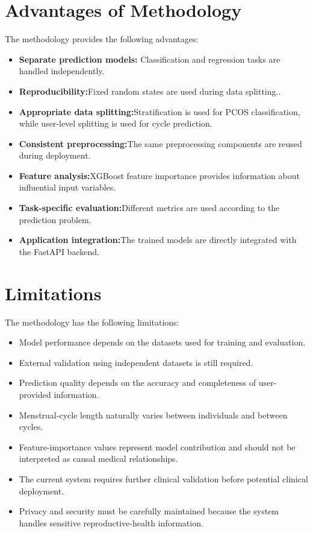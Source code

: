 \section{Advantages of Methodology}
\label{sec:AdvMetho}
The methodology provides the following advantages:
\begin{itemize}
    \item \textbf{Separate prediction models:} Classification and regression tasks are handled independently.
    \item \textbf{Reproducibility:}Fixed random states are used during data splitting..
    \item \textbf{Appropriate data splitting:}Stratification is used for PCOS classification, while user-level splitting is used for cycle prediction.
    \item \textbf{Consistent preprocessing:}The same preprocessing components are reused during deployment.
    \item \textbf{Feature analysis:}XGBoost feature importance provides information about influential input variables.
    \item \textbf{Task-specific evaluation:}Different metrics are used according to the prediction problem.
    \item \textbf{Application integration:}The trained models are directly integrated with the FastAPI backend.
\end{itemize}

\section{Limitations}
The methodology has the following limitations:
\begin{itemize}
    \item Model performance depends on the datasets used for training and evaluation.
    \item External validation using independent datasets is still required.
    \item Prediction quality depends on the accuracy and completeness of user-provided information.
    \item Menstrual-cycle length naturally varies between individuals and between cycles.
    \item Feature-importance values represent model contribution and should not be interpreted as causal medical relationships.
    \item The current system requires further clinical validation before potential clinical deployment. \cite{pi2025}
    \item Privacy and security must be carefully maintained because the system handles sensitive reproductive-health information. \cite{kotz2016}
\end{itemize}


